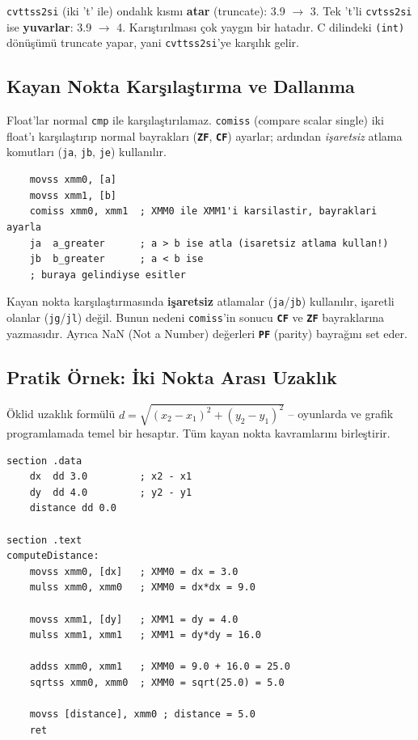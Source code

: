 \documentclass[11pt,a4paper]{article}
\newcommand{\reg}[1]{\texttt{\color{anaMavi}\textbf{#1}}}
\newcommand{\kod}[1]{\texttt{\color{koyuGri}#1}}
\begin{document}
\begin{uyarikutu}
\kod{cvttss2si} (iki 't' ile) ondalık kısmı \textbf{atar} (truncate): 3.9 $\to$ 3.
Tek 't'li \kod{cvtss2si} ise \textbf{yuvarlar}: 3.9 $\to$ 4. Karıştırılması çok
yaygın bir hatadır. C dilindeki \kod{(int)} dönüşümü truncate yapar, yani
\kod{cvttss2si}'ye karşılık gelir.
\end{uyarikutu}

\subsection{Kayan Nokta Karşılaştırma ve Dallanma}

Float'lar normal \kod{cmp} ile karşılaştırılamaz. \kod{comiss} (compare
scalar single) iki float'ı karşılaştırıp normal bayrakları (\reg{ZF},
\reg{CF}) ayarlar; ardından \emph{işaretsiz} atlama komutları (\kod{ja},
\kod{jb}, \kod{je}) kullanılır.

\begin{ornekkutu}
\begin{lstlisting}
    movss xmm0, [a]
    movss xmm1, [b]
    comiss xmm0, xmm1  ; XMM0 ile XMM1'i karsilastir, bayraklari ayarla
    ja  a_greater      ; a > b ise atla (isaretsiz atlama kullan!)
    jb  b_greater      ; a < b ise
    ; buraya gelindiyse esitler
\end{lstlisting}
\end{ornekkutu}

\begin{ipucukutu}
Kayan nokta karşılaştırmasında \textbf{işaretsiz} atlamalar (\kod{ja}/\kod{jb})
kullanılır, işaretli olanlar (\kod{jg}/\kod{jl}) değil. Bunun nedeni
\kod{comiss}'in sonucu \reg{CF} ve \reg{ZF} bayraklarına yazmasıdır. Ayrıca
NaN (Not a Number) değerleri \reg{PF} (parity) bayrağını set eder.
\end{ipucukutu}

\subsection{Pratik Örnek: İki Nokta Arası Uzaklık}

Öklid uzaklık formülü $d = \sqrt{(x_2-x_1)^2 + (y_2-y_1)^2}$ -- oyunlarda ve
grafik programlamada temel bir hesaptır. Tüm kayan nokta kavramlarını
birleştirir.

\begin{ornekkutu}
\begin{lstlisting}
section .data
    dx  dd 3.0         ; x2 - x1
    dy  dd 4.0         ; y2 - y1
    distance dd 0.0

section .text
computeDistance:
    movss xmm0, [dx]   ; XMM0 = dx = 3.0
    mulss xmm0, xmm0   ; XMM0 = dx*dx = 9.0

    movss xmm1, [dy]   ; XMM1 = dy = 4.0
    mulss xmm1, xmm1   ; XMM1 = dy*dy = 16.0

    addss xmm0, xmm1   ; XMM0 = 9.0 + 16.0 = 25.0
    sqrtss xmm0, xmm0  ; XMM0 = sqrt(25.0) = 5.0

    movss [distance], xmm0 ; distance = 5.0
    ret
\end{lstlisting}
\end{ornekkutu}
\end{document}
